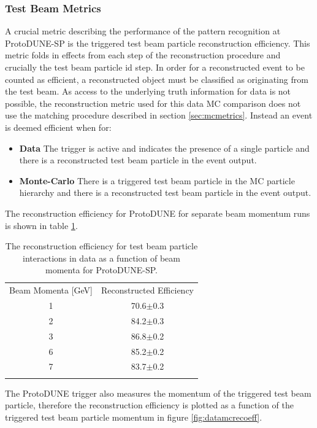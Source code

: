 \subsubsection{Test Beam Metrics}
A crucial metric describing the performance of the pattern recognition at ProtoDUNE-SP is the triggered test beam particle reconstruction efficiency.  This metric folds in effects from each step of the reconstruction procedure and crucially the test beam particle id step.  In order for a reconstructed event to be counted as efficient, a reconstructed object must be classified as originating from the test beam.  As access to the underlying truth information for data is not possible, the reconstruction metric used for this data MC comparison does not use the matching procedure described in section \ref{sec:mcmetrics}.  Instead an event is deemed efficient when for:

\begin{itemize}
    \item \textbf{Data} The trigger is active and indicates the presence of a single particle and there is a reconstructed test beam particle in the event output.
    \item \textbf{Monte-Carlo} There is a triggered test beam particle in the MC particle hierarchy and there is a reconstructed test beam particle in the event output.
\end{itemize}

The reconstruction efficiency for ProtoDUNE for separate beam momentum runs is shown in table \ref{tab:dataeff}.  

\begin{table}
\centering
\caption{The reconstruction efficiency for test beam particle interactions in data as a function of beam momenta for ProtoDUNE-SP.}
\label{tab:dataeff} 
\begin{tabular}{cc}
\hline\noalign{\smallskip}
Beam Momenta [GeV] & Reconstructed Efficiency  \\
\noalign{\smallskip}\hline\noalign{\smallskip}
1 & 70.6$\pm$0.3 \\
2 & 84.2$\pm$0.3 \\
3 & 86.8$\pm$0.2 \\
6 & 85.2$\pm$0.2 \\
7 & 83.7$\pm$0.2 \\
\noalign{\smallskip}\hline
\end{tabular}
\end{table}

The ProtoDUNE trigger also measures the momentum of the triggered test beam particle, therefore the reconstruction efficiency is plotted as a function of the triggered test beam particle momentum in figure \ref{fig:datamcrecoeff}.  

